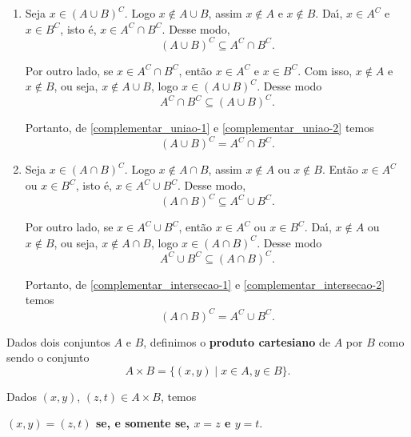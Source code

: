 \begin{prova}
	\begin{enumerate}[label={\roman*})]
		\item Seja $x \in (A\cup B)^C$. Logo $x\notin A\cup B$, assim $x\notin A$ e $x\notin B$. Da{\'\i}, $x\in A^C$ e $x\in B^C$, isto {\'e}, $x\in A^C\cap B^C$. Desse modo,
		\begin{equation}\label{complementar_uniao-1}
			(A\cup B)^C \subseteq A^C\cap B^C.
		\end{equation}

		Por outro lado, se $x\in A^C\cap B^C$, ent{\~a}o $x\in A^C$ e $x\in B^C$. Com isso, $x\notin A$ e $x\notin B$, ou seja, $x\notin A\cup B$, logo $x\in (A\cup B)^C$. Desse modo
		\begin{equation}\label{complementar_uniao-2}
			A^C\cap B^C\subseteq(A\cup B)^C.
		\end{equation}

		Portanto, de \eqref{complementar_uniao-1} e \eqref{complementar_uniao-2} temos
		\[
			(A\cup B)^C = A^C\cap B^C.
		\]

		\item Seja $x \in (A\cap B)^C$. Logo $x\notin A\cap B$, assim $x\notin A$ ou $x\notin B$. Ent\~ao $x\in A^C$ ou $x\in B^C$, isto {\'e}, $x\in A^C\cup B^C$. Desse modo,
		\begin{equation}\label{complementar_intersecao-1}
			(A\cap B)^C \subseteq A^C\cup B^C.
		\end{equation}

		Por outro lado, se $x\in A^C\cup B^C$, ent{\~a}o $x\in A^C$ ou $x\in B^C$. Da{\'\i}, $x\notin A$ ou $x\notin B$, ou seja, $x\notin A\cap B$, logo $x\in (A\cap B)^C$. Desse modo
		\begin{equation}\label{complementar_intersecao-2}
			A^C\cup B^C\subseteq(A\cap B)^C.
		\end{equation}

		Portanto, de \eqref{complementar_intersecao-1} e \eqref{complementar_intersecao-2} temos
		\[
			(A\cap B)^C = A^C\cup B^C.
		\]
	\end{enumerate}
\end{prova}

\begin{definicao}
	Dados dois conjuntos $A$ e $B$, definimos o \textbf{produto cartesiano} de $A$ por $B$ como sendo o conjunto
	\[
		A \times B = \{(x,y) \mid x\in A, y\in B\}.
	\]
\end{definicao}

Dados $(x,y)$, $(z,t) \in A\times B$, temos
\begin{center}
	\textbf{$(x,y) = (z,t)$ se, e somente se, $x = z$ e $y = t$}.
\end{center}

